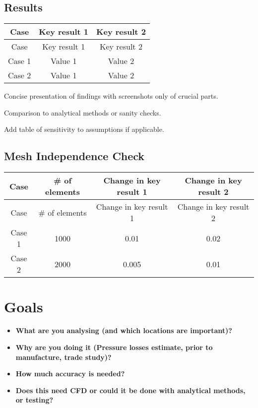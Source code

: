 \subsection*{Results}
\begin{longtable}{|c|c|c|}
    \hline
    Case & Key result 1 & Key result 2 \\
    \hline
    \endfirsthead
    \hline
    Case & Key result 1 & Key result 2 \\
    \hline
    \endhead
    \hline
    \endfoot
    \hline
    Case 1 & Value 1 & Value 2 \\
    Case 2 & Value 1 & Value 2 \\
\end{longtable}

\noindent Concise presentation of findings with screenshots only of crucial parts.

\noindent Comparison to analytical methods or sanity checks.

\noindent Add table of sensitivity to assumptions if applicable.

\subsection*{Mesh Independence Check}
\begin{longtable}{|c|c|c|c|}
    \hline
    Case & \# of elements & Change in key result 1 & Change in key result 2 \\
    \hline
    \endfirsthead
    \hline
    Case & \# of elements & Change in key result 1 & Change in key result 2 \\
    \hline
    \endhead
    \hline
    \endfoot
    \hline
    Case 1 & 1000 & 0.01 & 0.02 \\
    Case 2 & 2000 & 0.005 & 0.01 \\
\end{longtable}

\newpage

\section*{Goals}
\begin{itemize}
    \item \textbf{What are you analysing (and which locations are important)?}
    \item \textbf{Why are you doing it (Pressure losses estimate, prior to manufacture, trade study)?}
    \item \textbf{How much accuracy is needed?}
    \item \textbf{Does this need CFD or could it be done with analytical methods, or testing?}
\end{itemize}

